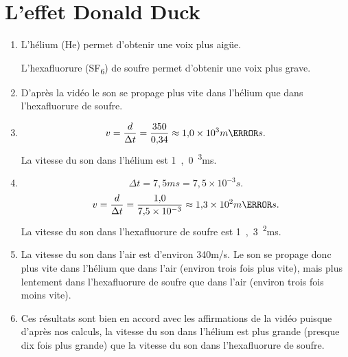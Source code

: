 \documentclass[12pt,a4paper,fleqn]{article}
\begin{document}
\section*{L'effet Donald Duck}

\begin{enumerate}[resume]
\item
L'hélium (He) permet d'obtenir une voix plus aigüe.

L'hexafluorure (SF\textsubscript{6}) de soufre permet d'obtenir une voix plus grave.

\item
D'après la vidéo le son se propage plus vite dans l'hélium que dans l'hexafluorure de soufre.

\item
\[ v = \frac{d}{\Delta t} = \frac{350}{0{,}34} \approx \unit{1{,}0\times10^3}{m\per s}.\]
La vitesse du son dans l'hélium est \unit{1{,}0^3}{m\per s}.

\item
\[ \Delta t = \unit{7{,}5}{ms} = \unit{7{,}5\times 10^{-3}}{s}. \]
\[ v = \frac{d}{\Delta t} = \frac{1{,}0}{7{,}5\times 10^{-3}} \approx \unit{1{,}3\times10^2}{m\per s}.\]
La vitesse du son dans l'hexafluorure de soufre est \unit{1{,}3^2}{m\per s}.

\item
La vitesse du son dans l'air est d'environ \unit{340}{m/s}.
Le son se propage donc plus vite dans l'hélium que dans l'air (environ trois fois plus vite), mais plus lentement dans l'hexafluorure de soufre que dans l'air (environ trois fois moins vite).

\item
Ces résultats sont bien en accord avec les affirmations de la vidéo puisque d'après nos calculs, la vitesse du son dans l'hélium est plus grande (presque dix fois plus grande) que la vitesse du son dans l'hexafluorure de soufre.
\end{enumerate}
\end{document}
